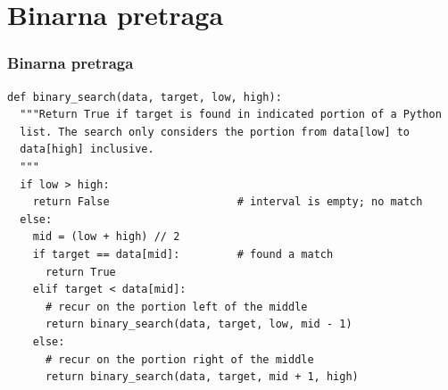 \documentclass[compress,aspectratio=169]{beamer}
\begin{document}
\section[Binarna pretraga]{Binarna pretraga}
\begin{frame}[fragile,shrink=15]
  \frametitle{Binarna pretraga}
\begin{verbatim}
def binary_search(data, target, low, high):
  """Return True if target is found in indicated portion of a Python 
  list. The search only considers the portion from data[low] to 
  data[high] inclusive.
  """
  if low > high:
    return False                    # interval is empty; no match
  else:
    mid = (low + high) // 2
    if target == data[mid]:         # found a match
      return True
    elif target < data[mid]:
      # recur on the portion left of the middle
      return binary_search(data, target, low, mid - 1)
    else:
      # recur on the portion right of the middle
      return binary_search(data, target, mid + 1, high)
\end{verbatim}  
\end{frame}
\end{document}
